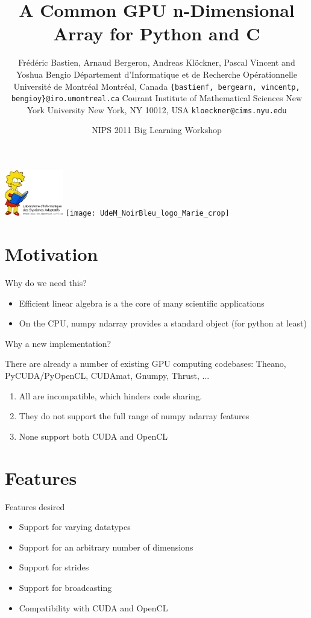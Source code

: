 \documentclass[utf8x,xcolor=pdftex,dvipsnames,table]{beamer}
\title{A Common GPU n-Dimensional Array for Python and C}
\author{
\footnotesize
Frédéric Bastien\superscript{a}, Arnaud Bergeron\superscript{a}, Andreas Klöckner\superscript{b}, \newline
Pascal Vincent\superscript{a} and Yoshua Bengio\superscript{a} \newline \newline
\superscript{a}Département d'Informatique et de Recherche Opérationnelle \newline
Université de Montréal \newline
Montréal, Canada \newline
\texttt{\{bastienf, bergearn, vincentp, bengioy\}@iro.umontreal.ca} \newline \newline
\superscript{b}Courant Institute of Mathematical Sciences \newline
New York University\newline
New York, NY 10012, USA\newline
\texttt{kloeckner@cims.nyu.edu}
}
\date{NIPS 2011 Big Learning Workshop}
\begin{document}
\begin{frame}[plain]
 \titlepage
 \vspace{-5em}
 \includegraphics[width=1in]{lisabook_logo_text_3.png}
 \hfill
 \texttt{[image: UdeM\_NoirBleu\_logo\_Marie\_crop]}
\end{frame}

\setcounter{page}{1}

\section{Motivation}

\begin{frame}{Why do we need this?}
\begin{itemize}
\item Efficient linear algebra is a the core of many scientific applications
\item On the CPU, numpy ndarray provides a standard object (for python at least)
\end{itemize}
\end{frame}

\begin{frame}{Why a new implementation?}
\begin{block}{There are already a number of existing GPU computing codebases:}
Theano, PyCUDA/PyOpenCL, CUDAmat, Gnumpy, Thrust, ...
\end {block}
\begin{enumerate}
\item<2-> All are incompatible, which hinders code sharing.
\item<3-> They do not support the full range of numpy ndarray features
\item<4-> None support both CUDA and OpenCL
\end{enumerate}
\end{frame}

\section{Features}
\begin{frame}{Features desired}
\begin{itemize}
\item Support for varying datatypes
\item Support for an arbitrary number of dimensions
\item Support for strides
\item \color{gray!80} Support for broadcasting
\item Compatibility with CUDA and OpenCL
\end{itemize}
\end{frame}
\end{document}
